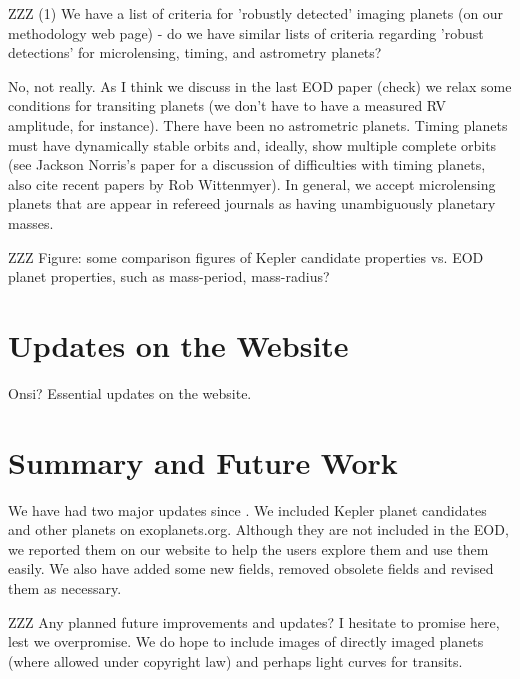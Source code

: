\documentclass[11pt,preprint]{aastex}
\begin{document}
\begin{CJK*}{UTF8}{gbsn}
ZZZ (1) We have a list of criteria for 'robustly detected' imaging planets (on our methodology web page) - do we have similar lists of criteria regarding 'robust detections' for microlensing, timing, and astrometry planets?

No, not really.  As I think we discuss in the last EOD paper (check) we relax some conditions for transiting planets (we don't have to have a measured RV amplitude, for instance).  There have been no astrometric planets.  Timing planets must have dynamically stable orbits and, ideally, show multiple complete orbits (see Jackson Norris's paper for a discussion of difficulties with timing planets, also cite recent papers by Rob Wittenmyer).  In general, we accept microlensing planets that are appear in refereed journals as having unambiguously planetary masses.
 
ZZZ Figure: some comparison figures of Kepler candidate properties vs. EOD
planet properties, such as mass-period, mass-radius?


\section{Updates on the Website}\label{sec:website}

Onsi? Essential updates on the website.


\section{Summary and Future Work}\label{sec:conclusion}

We have had two major updates since \cite{Wright2011}. We included Kepler planet candidates and other planets on exoplanets.org. Although they are not included in the EOD, we reported them on our website to help the users explore them and use them easily. We also have added some new fields, removed obsolete fields and revised them as necessary. 

ZZZ Any planned future improvements and updates?
I hesitate to promise here, lest we overpromise.  We do hope to include images of directly imaged planets (where allowed under copyright law) and perhaps light curves for transits. 


\acknowledgments


\end{CJK*}
\end{document}
